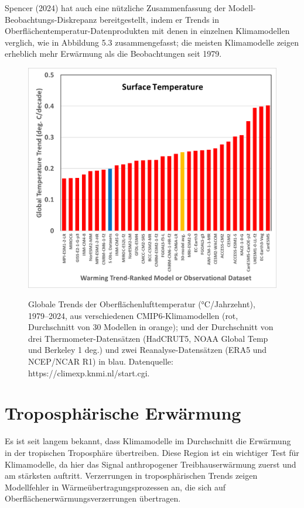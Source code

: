 \documentclass[12pt,paper=a4,DIV=12,parskip=never,chapterprefix=false,headings=standardclasses]{scrreprt}
\begin{document}
Spencer (2024) hat auch eine nützliche Zusammenfassung der Modell-Beobachtungs-Diskrepanz bereitgestellt, indem er Trends in Oberflächentemperatur-Datenprodukten mit denen in einzelnen Klimamodellen verglich, wie in Abbildung 5.3 zusammengefasst; die meisten Klimamodelle zeigen erheblich mehr Erwärmung als die Beobachtungen seit 1979.

\begin{figure}[H]
\begin{center}
\includegraphics[width=1.0\textwidth]{bilder/bilderKlima-0027.png}\\[1cm]
\end{center}
\caption{Globale Trends der Oberflächenlufttemperatur (°C/Jahrzehnt), 1979–2024, aus verschiedenen CMIP6-Klimamodellen
(rot, Durchschnitt von 30 Modellen in orange); und der Durchschnitt von drei Thermometer-Datensätzen
(HadCRUT5, NOAA Global Temp und Berkeley 1 deg.) und zwei Reanalyse-Datensätzen (ERA5 und
NCEP/NCAR R1) in blau. Datenquelle: https://climexp.knmi.nl/start.cgi.}
\end{figure}

\section{Troposphärische Erwärmung}
Es ist seit langem bekannt, dass Klimamodelle im Durchschnitt die Erwärmung in der tropischen Troposphäre übertreiben. Diese Region ist ein wichtiger Test für Klimamodelle, da hier das Signal anthropogener Treibhauserwärmung zuerst und am stärksten auftritt. Verzerrungen in troposphärischen Trends zeigen Modellfehler in Wärmeübertragungsprozessen an, die sich auf Oberflächenerwärmungsverzerrungen übertragen.
\end{document}
